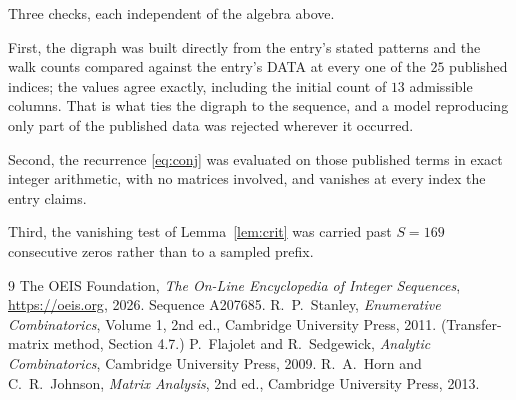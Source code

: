 \documentclass[11pt,a4paper]{article}
\theoremstyle{plain}
\theoremstyle{definition}
\begin{document}
Three checks, each independent of the algebra above.

First, the digraph was built directly from the entry's stated patterns and the walk counts
compared against the entry's DATA at every one of the $25$ published indices; the
values agree exactly, including the initial count of $13$ admissible columns. That is
what ties the digraph to the sequence, and a model reproducing only part of the published
data was rejected wherever it occurred.

Second, the recurrence \eqref{eq:conj} was evaluated on those published terms in exact
integer arithmetic, with no matrices involved, and vanishes at every index the entry claims.

Third, the vanishing test of Lemma~\ref{lem:crit} was carried past $S=169$ consecutive
zeros rather than to a sampled prefix.

\begin{thebibliography}{9}
 The OEIS Foundation, \emph{The On-Line Encyclopedia of Integer
Sequences}, \url{https://oeis.org}, 2026. Sequence A207685.
 R.~P.~Stanley, \emph{Enumerative Combinatorics}, Volume 1, 2nd ed.,
Cambridge University Press, 2011. (Transfer-matrix method, Section 4.7.)
 P.~Flajolet and R.~Sedgewick, \emph{Analytic Combinatorics}, Cambridge
University Press, 2009.
 R.~A.~Horn and C.~R.~Johnson, \emph{Matrix Analysis}, 2nd ed., Cambridge
University Press, 2013.
\end{thebibliography}
\end{document}
